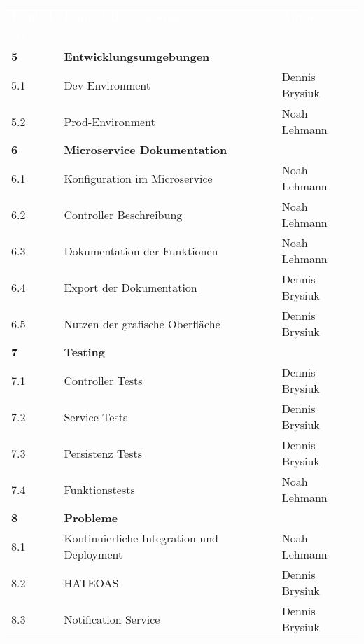 \newpage

\begin{table}[H]
\begin{center}
  \begin{tabular}{| l | l | l |}
 
\hline
\rowcolor{Gray}
\textcolor{white}{\textbf{Kapitel}} & \textcolor{white}{\textbf{Kapitel Bezeichnung}} & \textcolor{white}{\textbf{Autor}} \\
\rowcolor{Gray}
\textcolor{white}{\textbf{Nr.}} 	&  												  & \\  

\hline    
\rowcolor{LGray} 						
\textbf{5}	& \textbf{Entwicklungsumgebungen}	&	\\
\hline
5.1		& Dev-Environment					& Dennis Brysiuk \\
\hline
5.2		& Prod-Environment					& Noah Lehmann \\

\hline    
\rowcolor{LGray}
\textbf{6}		& \textbf{Microservice Dokumentation}	&  			\\
\hline
6.1		& Konfiguration im Microservice			& Noah Lehmann \\
\hline
6.2		& Controller Beschreibung				& Noah Lehmann \\
\hline
6.3		& Dokumentation der Funktionen			& Noah Lehmann \\
\hline
6.4		& Export der Dokumentation				& Dennis Brysiuk \\
\hline
6.5		& Nutzen der grafische Oberfläche		& Dennis Brysiuk \\

\hline    
\rowcolor{LGray}
\textbf{7}		& \textbf{Testing}	&  				\\
\hline
7.1		& Controller Tests				& Dennis Brysiuk \\
\hline
7.2		& Service Tests					& Dennis Brysiuk \\
\hline
7.3		& Persistenz Tests				& Dennis Brysiuk \\
\hline
7.4		& Funktionstests				& Noah Lehmann \\

\hline    
\rowcolor{LGray} 						
\textbf{8} & \textbf{Probleme} &  				\\
\hline
8.1		& Kontinuierliche Integration und Deployment	& Noah Lehmann \\
\hline
8.2		& HATEOAS										& Dennis Brysiuk \\
\hline
8.3		& Notification Service							& Dennis Brysiuk \\


\end{tabular}
\end{center}
\end{table}
